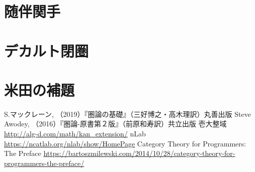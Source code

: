 \documentclass[dvipdfmx]{jsarticle}
\numberwithin{proof}{subsection}
\numberwithin{prop}{subsection}
\numberwithin{define}{subsection}
\begin{document}
	\section{随伴関手}
	\section{デカルト閉圏}
	\section{米田の補題}

	\begin{thebibliography}{99}
	 S.マックレーン, （2019）『圏論の基礎』（三好博之・高木理訳）丸善出版
	 Steve Awodey, （2016）『圏論-原書第２版』（前原和寿訳）共立出版
	 壱大整域 \url{http://alg-d.com/math/kan_extension/}
	 nLab \url{https://ncatlab.org/nlab/show/HomePage}
	 Category Theory for Programmers: The Preface \url{https://bartoszmilewski.com/2014/10/28/category-theory-for-programmers-the-preface/}
	\end{thebibliography}
\end{document}
